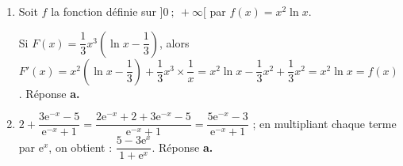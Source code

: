 \begin{enumerate}
$\bullet~~$On a $\dfrac{n}{n + 1} = \dfrac{1}{1 + \frac1 n}$.
Or $\displaystyle\lim_{n \to + \infty} \frac1 n = 0 \Rightarrow \displaystyle\lim_{n \to + \infty} \dfrac{n}{n + 1} = 1$ et $\displaystyle\lim_{n \to + \infty}2 - \dfrac{n}{n + 1} = 1$.



On a donc  $1  + \left(\dfrac14\right)^n \leqslant u_n \leqslant 2 - \dfrac{n}{n+1}$ avec  $\displaystyle\lim_{n \to + \infty}1 + \left(\dfrac14\right)^n = \displaystyle\lim_{n \to + \infty}2 - \dfrac{n}{n + 1} = 1$. 

D'après le théorème des gendarmes, on peut dire que la suite $(u_n)$ est convergente et que $\displaystyle\lim_{n \to + \infty} u_n=1$.\hfill
Réponse \textbf{b.}

\item Soit $f$ la fonction définie sur $]0~;~+\infty[$ par $f(x) = x^2 \ln x$.










Si $F(x) = \dfrac13 x^3 \left(\ln x - \dfrac13 \right)$, alors 
$F'(x) = x^2\left(\ln x - \dfrac13 \right) + \dfrac13 x^3 \times \dfrac{1}{x} = x^2 \ln x - \dfrac13 x^2  + \dfrac13 x^2 = x^2 \ln x = f(x)$. \hfill Réponse \textbf{a.}

\item 








$2 + \dfrac{3\text{e}^{-x} - 5}{\text{e}^{-x} + 1} = \dfrac{2\text{e}^{-x} + 2  + 3\text{e}^{-x} - 5}{\text{e}^{-x} + 1} = \dfrac{5\text{e}^{-x} - 3}{\text{e}^{-x} + 1}$ ; en multipliant chaque terme par $\text{e}^x$, on obtient : $\dfrac{5 - 3\text{e}^x}{1 + \text{e}^x}$. \hfill Réponse \textbf{a.}
\end{enumerate}

\bigskip
